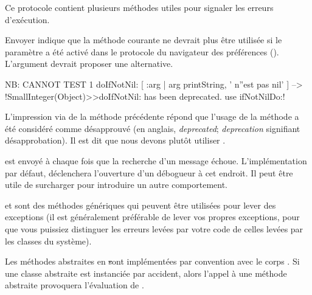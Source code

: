 \documentclass[a4paper,10pt,twoside]{book}
\begin{document}
Ce protocole contient plusieurs m\'ethodes utiles pour signaler les erreurs d'ex\'ecution.

Envoyer  indique que la m\'ethode courante ne devrait plus \^etre utilis\'ee si le param\`etre  a \'et\'e activ\'e dans le protocole  du navigateur des pr\'ef\'erences ().
L'argument  devrait proposer une alternative.

\begin{code}{NB: CANNOT TEST}
1 doIfNotNil: [ :arg | arg printString, ' n''est pas nil' ]
	--> !SmallInteger(Object)>>doIfNotNil: has been deprecated. use ifNotNilDo:!
\end{code}

L'impression via  de la m\'ethode pr\'ec\'edente
r\'epond que l'usage de la m\'ethode  a
\'et\'e consid\'er\'e comme d\'esapprouv\'e (en anglais,
\emph{deprecated}; \emph{deprecation} signifiant d\'esapprobation). Il
est dit que nous devons plut\^ot utiliser .

 est envoy\'e \`a chaque fois que la recherche d'un message \'echoue. L'impl\'ementation par d\'efaut, \ie {} d\'eclenchera l'ouverture d'un d\'ebogueur \`a cet endroit. Il peut \^etre utile de surcharger  pour introduire un autre comportement.


 et  sont des m\'ethodes g\'en\'eriques qui peuvent \^etre utilis\'ees pour lever des exceptions
(il est g\'en\'eralement pr\'ef\'erable de lever vos propres exceptions, pour que vous puissiez distinguer les erreurs lev\'ees par votre code de celles lev\'ees par les classes du syst\`eme).

Les m\'ethodes abstraites en \st sont impl\'ement\'ees par convention
avec le corps . Si une
classe abstraite est instanci\'ee par accident, alors l'appel \`a une
m\'ethode abstraite provoquera l'\'evaluation de
.
\end{document}
